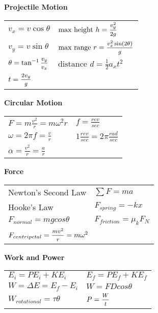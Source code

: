 \documentclass[12pt]{article}
\begin{document}
%
%
\begin{minipage}[t]{.5\textwidth}
\textbf{Projectile Motion} \\[6pt]
	\begin{tabular}{p{3cm} p{6cm}}
	$v_x = v \cos \theta$ & $\text{max height   } h = \mfrac{v_{y}^2}{2g}$ \\[6pt]
	$v_y = v \sin \theta$ & $\text{max range   } r = \mfrac{v_{x}^2 \sin(2\theta)}{g}$ \\[6pt]
		
	$\theta = \tan ^{-1} \mfrac{v_y}{v_x}$ & $\text{distance    } d = \tfrac{1}{2} a_x t^2$ \\[6pt]
	$t = \mfrac{2v_{y}}{g}$ & \\[6pt]
	\end{tabular}

\end{minipage}\vspace{12pt}
%
%
\begin{minipage}[t]{.5\textwidth}
\textbf{Circular Motion} \\[6pt]
\begin{tabular}{p{4cm} p{6cm}}
	$F=m \frac{v^2}{r}=m \omega^2 r$ & 

$f = \frac{rev}{sec}$ \\[6pt]
	$\omega = 2\pi f = \frac{v}{r}$ & $1 \frac{rev}{sec} = 2\pi \frac{rad}{sec}$ \\[6pt]
	$\alpha = \frac{v^2}{r} = \frac{a}{r}$ & \\[12pt]
\end{tabular}	
\end{minipage}

%
%
\begin{minipage}[t]{.5\textwidth}
\textbf{Force} \\[6pt]
\begin{tabular}{p{4cm} p{6cm}}
	\small{Newton's Second Law} & $\sum F = ma$ \\[6pt]
	\small{Hooke's Law} & $F_{spring} = -kx$ \\[6pt]
	$F_{normal} = mgcos\theta$ & $F_{friction} = \mu_k F_N$ \\[6pt]
	\multicolumn{2}{l}{	$F_{centripetal} = \mfrac{mv^2}{r} = m\omega^2$} \\[12pt]
\end{tabular}	
\end{minipage}
%
%
\begin{minipage}[t]{.5\textwidth}
\textbf{Work and Power} \\[6pt]
\begin{tabular}{p{4cm} p{6cm}}
	$E_i = PE_i + KE_i$ & $E_f = PE_f + KE_f$ \\[6pt]
	$W = \Delta E = E_f - E_i$ & $W = FDcos\theta$ \\[6pt]
	$W_{rotational} = \tau \theta$ & $P = \mfrac{W}{t}$ \\[6pt]
\end{tabular}	
\end{minipage}
\vspace{12pt}
\end{document}
